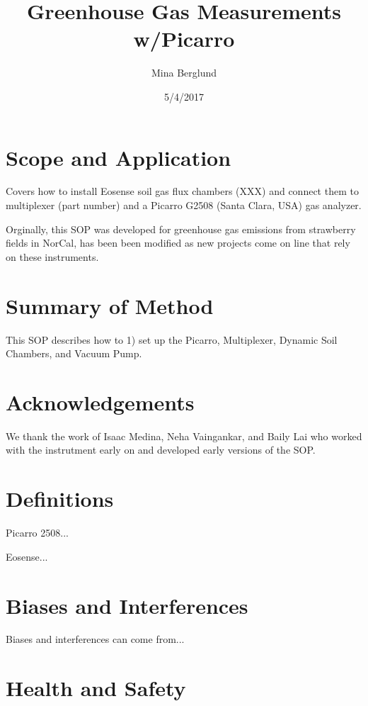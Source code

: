 \documentclass[12pt]{../SOP3}\usepackage[]{graphicx}\usepackage[]{color}
\title{Greenhouse Gas Measurements w/Picarro}
\date{5/4/2017}
\author{Mina Berglund}
\begin{document}
\maketitle

\section{Scope and Application}

\NP Covers how to install Eosense soil gas flux chambers (XXX) and connect them to multiplexer (part number) and a Picarro G2508 (Santa Clara, USA) gas analyzer.

\NP Orginally, this SOP was developed for greenhouse gas emissions from strawberry fields in NorCal, has been been modified as new projects come on line that rely on these instruments. 

\section{Summary of Method}

\NP This SOP describes how to 1) set up the Picarro, Multiplexer, Dynamic Soil Chambers, and Vacuum Pump. 

\tableofcontents

\newpage

\section{Acknowledgements}

We thank the work of Isaac Medina, Neha Vaingankar, and Baily Lai who worked with the instrutment early on and developed early versions of the SOP. 

\section{Definitions}

\NP Picarro 2508...

\NP Eosense...

\section{Biases and Interferences}

\NP Biases and interferences can come from...

\section{Health and Safety}
\end{document}
